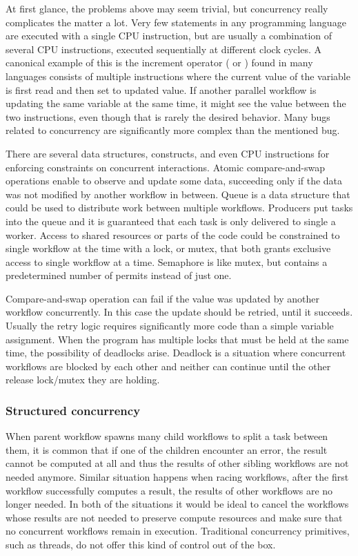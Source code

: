 At first glance, the problems above may seem trivial, but concurrency really complicates the matter a lot. Very few statements in any programming language are executed with a single CPU instruction, but are usually a combination of several CPU instructions, executed sequentially at different clock cycles. A canonical example of this is the increment operator (\inlinecode{++} or \inlinecode{+=}) found in many languages consists of multiple instructions where the current value of the variable is first read and then set to updated value. If another parallel workflow is updating the same variable at the same time, it might see the value between the two instructions, even though that is rarely the desired behavior. Many bugs related to concurrency are significantly more complex than the mentioned bug.

There are several data structures, constructs, and even CPU instructions for enforcing constraints on concurrent interactions. Atomic compare-and-swap operations enable to observe and update some data, succeeding only if the data was not modified by another workflow in between. Queue is a data structure that could be used to distribute work between multiple workflows. Producers put tasks into the queue and it is guaranteed that each task is only delivered to single a worker. Access to shared resources or parts of the code could be constrained to single workflow at the time with a lock, or mutex, that both grants exclusive access to single workflow at a time. Semaphore is like mutex, but contains a predetermined number of permits instead of just one.

Compare-and-swap operation can fail if the value was updated by another workflow concurrently. In this case the update should be retried, until it succeeds. Usually the retry logic requires significantly more code than a simple variable assignment. When the program has multiple locks that must be held at the same time, the possibility of deadlocks arise. Deadlock is a situation where concurrent workflows are blocked by each other and neither can continue until the other release lock/mutex they are holding.


\subsubsection{Structured concurrency}
When parent workflow spawns many child workflows to split a task between them, it is common that if one of the children encounter an error, the result cannot be computed at all and thus the results of other sibling workflows are not needed anymore. Similar situation happens when racing workflows, after the first workflow successfully computes a result, the results of other workflows are no longer needed. In both of the situations it would be ideal to cancel the workflows whose results are not needed to preserve compute resources and make sure that no concurrent workflows remain in execution. Traditional concurrency primitives, such as threads, do not offer this kind of control out of the box.

